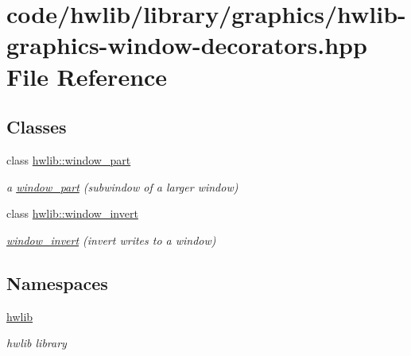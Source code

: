 \hypertarget{hwlib-graphics-window-decorators_8hpp}{}\section{code/hwlib/library/graphics/hwlib-\/graphics-\/window-\/decorators.hpp File Reference}
\label{hwlib-graphics-window-decorators_8hpp}
\subsection*{Classes}
\begin{DoxyCompactItemize}
\item 
class \hyperlink{classhwlib_1_1window__part}{hwlib\+::window\+\_\+part}
\begin{DoxyCompactList}\small\item\em a \hyperlink{classhwlib_1_1window__part}{window\+\_\+part} (subwindow of a larger window) \end{DoxyCompactList}\item 
class \hyperlink{classhwlib_1_1window__invert}{hwlib\+::window\+\_\+invert}
\begin{DoxyCompactList}\small\item\em \hyperlink{classhwlib_1_1window__invert}{window\+\_\+invert} (invert writes to a window) \end{DoxyCompactList}\end{DoxyCompactItemize}
\subsection*{Namespaces}
\begin{DoxyCompactItemize}
\item 
 \hyperlink{namespacehwlib}{hwlib}
\begin{DoxyCompactList}\small\item\em hwlib library \end{DoxyCompactList}\end{DoxyCompactItemize}
